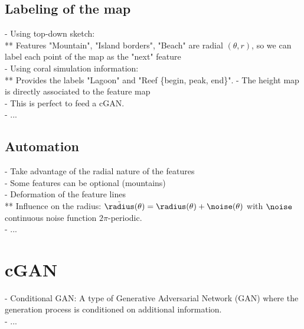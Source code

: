 \subsection{Labeling of the map}
- Using top-down sketch: \\
** Features "Mountain", "Island borders", "Beach" are radial $(\theta, r)$, so we can label each point of the map as the "next" feature \\
- Using coral simulation information: \\
** Provides the labels "Lagoon" and "Reef \{begin, peak, end\}".
- The height map is directly associated to the feature map \\
- This is perfect to feed a cGAN. \\
- ... 

\subsection{Automation}
- Take advantage of the radial nature of the features \\
- Some features can be optional (mountains) \\
- Deformation of the feature lines \\ 
** Influence on the radius: $\Tilde \radius(\theta) = \radius(\theta) + \noise(\theta)$ with $\noise$ continuous noise function $2\pi$-periodic. \\
- ...

\section{cGAN}
\label{sec:coral-island_cGAN}
- Conditional GAN: A type of Generative Adversarial Network (GAN) where the generation process is conditioned on additional information. \\
- ...

